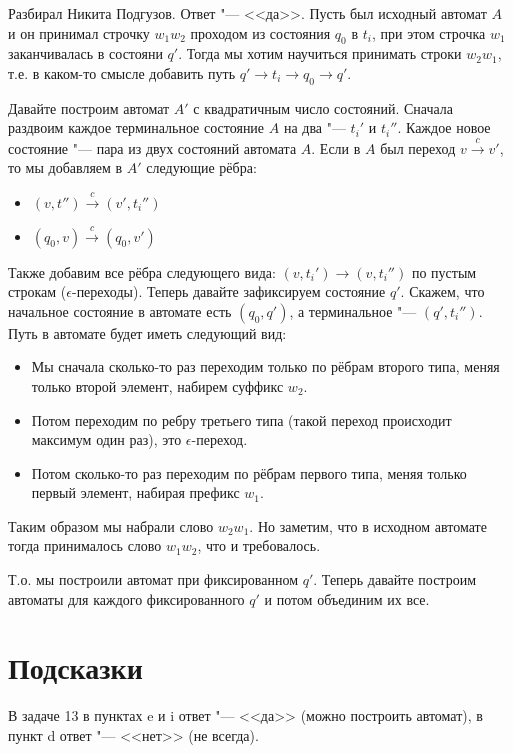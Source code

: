 	Разбирал Никита Подгузов.
	Ответ "--- <<да>>.
	Пусть был исходный автомат $A$ и он принимал строчку $w_1w_2$ проходом
	из состояния $q_0$ в $t_i$, при этом строчка $w_1$ заканчивалась в состояни $q'$.
	Тогда мы хотим научиться принимать строки $w_2w_1$, т.е. в каком-то смысле добавить
	путь $q' \to t_i \to q_0 \to q'$.

	Давайте построим автомат $A'$ с квадратичным число состояний.
	Сначала раздвоим каждое терминальное состояние $A$ на два "--- $t_i'$ и $t_i''$.
	Каждое новое состояние "--- пара из двух состояний автомата $A$.
	Если в $A$ был переход $v \xrightarrow{c} v'$, то мы добавляем в $A'$ следующие рёбра:
	\begin{itemize}
		\item $(v, t'') \xrightarrow{c} (v', t_i'')$
		\item $(q_0, v) \xrightarrow{c} (q_0, v')$
	\end{itemize}
	Также добавим все рёбра следующего вида: $(v, t_i') \to (v, t_i'')$ по пустым строкам ($\epsilon$-переходы).
	Теперь давайте зафиксируем состояние $q'$.
	Скажем, что начальное состояние в автомате есть $(q_0, q')$, а терминальное "--- $(q', t_i'')$.
	Путь в автомате будет иметь следующий вид:
	\begin{itemize}
		\item
			Мы сначала сколько-то раз переходим только по рёбрам второго типа, меняя только второй элемент, набирем суффикс $w_2$.
		\item
			Потом переходим по ребру третьего типа (такой переход происходит максимум один раз), это $\epsilon$-переход.
		\item
			Потом сколько-то раз переходим по рёбрам первого типа, меняя только первый элемент, набирая префикс $w_1$.
	\end{itemize}
	Таким образом мы набрали слово $w_2w_1$.
	Но заметим, что в исходном автомате тогда принималось слово $w_1w_2$, что и требовалось.

	Т.о. мы построили автомат при фиксированном $q'$.
	Теперь давайте построим автоматы для каждого фиксированного $q'$ и потом объединим их все.

\section{Подсказки}
	В задаче 13 в пунктах e и i ответ "--- <<да>> (можно построить автомат), в пункт d ответ "--- <<нет>> (не всегда).
